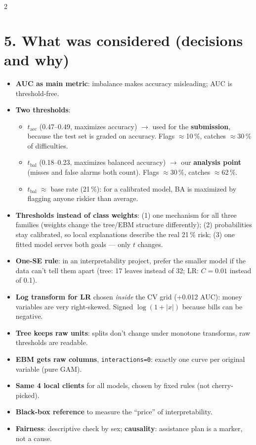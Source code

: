 \documentclass[a4paper,9pt]{extarticle}
\begin{document}
\begin{multicols}{2}
\section{5. What was considered (decisions and why)}
\begin{itemize}
\item \textbf{AUC as main metric}: imbalance makes accuracy misleading; AUC is threshold-free.
\item \textbf{Two thresholds}:
  \begin{itemize}
  \item $t_{\text{acc}}$ (0.47--0.49, maximizes accuracy) $\to$ used for the \textbf{submission}, because the
        test set is graded on accuracy. Flags $\approx$10\,\%, catches $\approx$30\,\% of difficulties.
  \item $t_{\text{bal}}$ (0.18--0.23, maximizes balanced accuracy) $\to$ our \textbf{analysis point}
        (misses and false alarms both count). Flags $\approx$30\,\%, catches $\approx$62\,\%.
  \item $t_{\text{bal}}$ $\approx$ base rate (21\,\%): for a calibrated model, BA is maximized by flagging
        anyone riskier than average.
  \end{itemize}
\item \textbf{Thresholds instead of class weights}: (1) one mechanism for all three families (weights change the
      tree/EBM structure differently); (2) probabilities stay calibrated, so local explanations describe the real
      21\,\% risk; (3) one fitted model serves both goals --- only $t$ changes.
\item \textbf{One-SE rule}: in an interpretability project, prefer the smaller model if the data can't tell
      them apart (tree: 17 leaves instead of 32; LR: $C=0.01$ instead of 0.1).
\item \textbf{Log transform for LR} chosen \emph{inside} the CV grid (+0.012 AUC): money variables are very
      right-skewed. Signed $\log(1+|x|)$ because bills can be negative.
\item \textbf{Tree keeps raw units}: splits don't change under monotone transforms, raw thresholds are readable.
\item \textbf{EBM gets raw columns}, \texttt{interactions=0}: exactly one curve per original variable (pure GAM).
\item \textbf{Same 4 local clients} for all models, chosen by fixed rules (not cherry-picked).
\item \textbf{Black-box reference} to measure the ``price'' of interpretability.
\item \textbf{Fairness}: descriptive check by sex; \textbf{causality}: assistance plan is a marker, not a cause.
\end{itemize}


\end{multicols}
\end{document}
